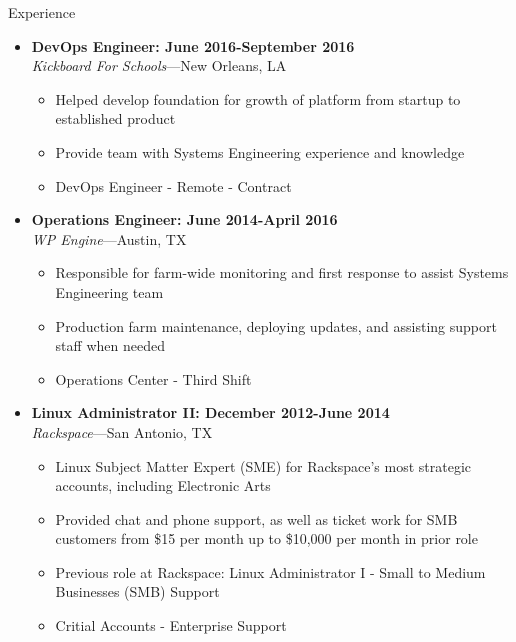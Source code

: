 \documentclass[10pt,oneside]{article}
\newenvironment{ressection}[1]{
    \vspace{4pt}
    {\fontfamily{phv}\selectfont\Large#1}
    \begin{itemize}
    \vspace{3pt}
}{
    \end{itemize}
}
\newcommand{\ressubitem}[1]{
    \vspace{-1pt}
    \item \begin{flushleft} #1 \end{flushleft}
}
\newcommand{\resbigitem}[3]{
    \vspace{-5pt}
    \item
    \textbf{#3} \\
    \textit{#1}---#2
}
\newenvironment{ressubsec}[3]{
    \resbigitem{#1}{#2}{#3}
    \vspace{-2pt}
    \begin{itemize}
}{
    \end{itemize}
}
\begin{document}
\begin{ressection}{Experience}
    \begin{ressubsec}{Kickboard For Schools}{New Orleans, LA}{DevOps Engineer: June 2016-September 2016}
        \ressubitem{Helped develop foundation for growth of platform from startup to established product}
        \ressubitem{Provide team with Systems Engineering experience and knowledge}
        \ressubitem{DevOps Engineer - Remote - Contract}
    \end{ressubsec}

    \pagebreak

    \begin{ressubsec}{WP Engine}{Austin, TX}{Operations Engineer: June 2014-April 2016}
        \ressubitem{Responsible for farm-wide monitoring and first response to assist Systems Engineering team}
        \ressubitem{Production farm maintenance, deploying updates, and assisting support staff when needed}
        \ressubitem{Operations Center - Third Shift}
    \end{ressubsec}

    \begin{ressubsec}{Rackspace}{San Antonio, TX}{Linux Administrator II: December 2012-June 2014}
        \ressubitem{Linux Subject Matter Expert (SME) for Rackspace's most strategic accounts, including Electronic Arts}
        \ressubitem{Provided chat and phone support, as well as ticket work for SMB customers from \$15 per month up to \$10,000 per month in prior role}
        \ressubitem{Previous role at Rackspace: Linux Administrator I - Small to Medium Businesses (SMB) Support}
        \ressubitem{Critial Accounts - Enterprise Support}
    \end{ressubsec}

\end{ressection}
\end{document}
